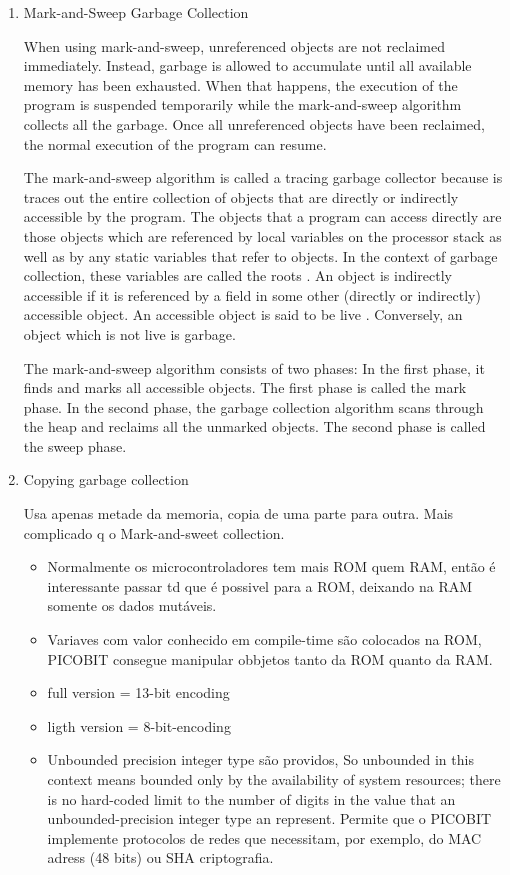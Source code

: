 \documentclass[11pt]{article}
\begin{document}
\begin{enumerate}
\item Mark-and-Sweep Garbage Collection
\label{sec-5-2-3-1}

When using mark-and-sweep, unreferenced objects are not reclaimed immediately. Instead, garbage is allowed to accumulate until all available memory has been exhausted. When that happens, the execution of the program is suspended temporarily while the mark-and-sweep algorithm collects all the garbage. Once all unreferenced objects have been reclaimed, the normal execution of the program can resume.

The mark-and-sweep algorithm is called a tracing garbage collector because is traces out the entire collection of objects that are directly or indirectly accessible by the program. The objects that a program can access directly are those objects which are referenced by local variables on the processor stack as well as by any static variables that refer to objects. In the context of garbage collection, these variables are called the roots . An object is indirectly accessible if it is referenced by a field in some other (directly or indirectly) accessible object. An accessible object is said to be live . Conversely, an object which is not live is garbage.

The mark-and-sweep algorithm consists of two phases: In the first phase, it finds and marks all accessible objects. The first phase is called the mark phase. In the second phase, the garbage collection algorithm scans through the heap and reclaims all the unmarked objects. The second phase is called the sweep phase.

\item Copying garbage collection
\label{sec-5-2-3-2}

Usa apenas metade da memoria, copia de uma parte para outra.
Mais complicado q o Mark-and-sweet collection.

\begin{itemize}
\item Normalmente os microcontroladores tem mais ROM quem RAM, então é interessante passar td que é possivel para a ROM, deixando na RAM somente os dados mutáveis.
\item Variaves com valor conhecido em compile-time são colocados na ROM, PICOBIT consegue manipular obbjetos tanto da ROM quanto da RAM.
\item full version = 13-bit encoding
\item ligth version = 8-bit-encoding
\item Unbounded precision integer type são providos, So unbounded in this context means bounded only by the availability of system resources; there is no hard-coded limit to the number of digits in the value that an unbounded-precision integer type an represent. Permite que o PICOBIT implemente protocolos de redes que necessitam, por exemplo, do MAC adress (48 bits) ou  SHA criptografia.
\end{itemize}
\end{enumerate}
\end{document}
